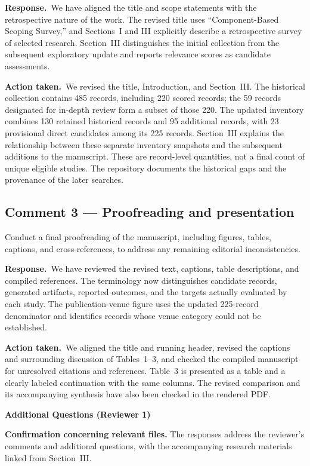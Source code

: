 \documentclass[11pt,a4paper]{article}
\newcommand{\response}{\par\textbf{Response.}\ }
\newcommand{\action}{\par\textbf{Action taken.}\ }
\newcommand{\additional}[1]{\par\Needspace{5\baselineskip}\vspace{5pt}\textbf{Additional Questions (Reviewer #1)}\par}
\begin{document}
\response We have aligned the title and scope statements with the retrospective nature of the work. The revised title uses ``Component-Based Scoping Survey,'' and Sections~I and III explicitly describe a retrospective survey of selected research. Section~III distinguishes the initial collection from the subsequent exploratory update and reports relevance scores as candidate assessments.

\action We revised the title, Introduction, and Section~III. The historical collection contains 485 records, including 220 scored records; the 59 records designated for in-depth review form a subset of those 220. The updated inventory combines 130 retained historical records and 95 additional records, with 23 provisional direct candidates among its 225 records. Section~III explains the relationship between these separate inventory snapshots and the subsequent additions to the manuscript. These are record-level quantities, not a final count of unique eligible studies. The repository documents the historical gaps and the provenance of the later searches.

\subsection{Comment 3 --- Proofreading and presentation}
\begin{reviewcomment}
Conduct a final proofreading of the manuscript, including figures, tables, captions, and cross-references, to address any remaining editorial inconsistencies.
\end{reviewcomment}

\response We have reviewed the revised text, captions, table descriptions, and compiled references. The terminology now distinguishes candidate records, generated artifacts, reported outcomes, and the targets actually evaluated by each study. The publication-venue figure uses the updated 225-record denominator and identifies records whose venue category could not be established.

\action We aligned the title and running header, revised the captions and surrounding discussion of Tables~1--3, and checked the compiled manuscript for unresolved citations and references. Table~3 is presented as a table and a clearly labeled continuation with the same columns. The revised comparison and its accompanying synthesis have also been checked in the rendered PDF.

\additional{1}

\textbf{Confirmation concerning relevant files.} The responses address the reviewer's comments and additional questions, with the accompanying research materials linked from Section~III.
\end{document}
